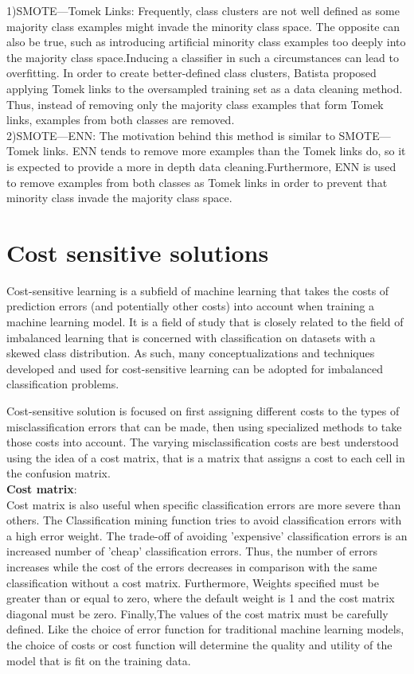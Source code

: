 1)SMOTE—Tomek Links: Frequently, class clusters are not well defined as some majority class examples might invade the minority class space. The opposite can also be true, such as introducing artificial minority class examples too deeply into the majority class space.Inducing a classifier in such a circumstances can lead to overfitting. In order to create better-defined class clusters, Batista proposed applying Tomek links to the oversampled training set as a data cleaning method. Thus, instead of removing only the majority class examples that form Tomek links, examples from both classes are removed.\noindent \\

2)SMOTE—ENN: The motivation behind this method is similar to SMOTE—Tomek links. ENN tends to remove more examples than the Tomek links do, so it is expected to provide a more in depth data cleaning.Furthermore, ENN is used to remove examples from both classes as Tomek links in order to prevent that minority class invade the majority class space. \noindent \\

\section{Cost sensitive solutions}
Cost-sensitive learning is a subfield of machine learning that takes the costs of prediction errors (and potentially other costs) into account when training a machine learning model. It is a field of study that is closely related to the field of imbalanced learning that is concerned with classification on datasets with a skewed class distribution. As such, many conceptualizations and techniques developed and used for cost-sensitive learning can be adopted for imbalanced classification problems.

Cost-sensitive solution is focused on first assigning different costs to the types of misclassification errors that can be made, then using specialized methods to take those costs into account.
The varying misclassification costs are best understood using the idea of a cost matrix, that is a matrix that assigns a cost to each cell in the confusion matrix.\noindent \\
\textbf{Cost matrix}:\noindent \\

Cost matrix is also useful when specific classification errors are more severe than others. The Classification mining function tries to avoid classification errors with a high error weight. The trade-off of avoiding 'expensive' classification errors is an increased number of 'cheap' classification errors. Thus, the number of errors increases while the cost of the errors decreases in comparison with the same classification without a cost matrix.
Furthermore, Weights specified must be greater than or equal to zero, where the default weight is 1 and the cost matrix diagonal must be zero.
Finally,The values of the cost matrix must be carefully defined. Like the choice of error function for traditional machine learning models, the choice of costs or cost function will determine the quality and utility of the model that is fit on the training data.\noindent \\

